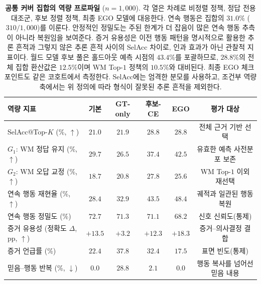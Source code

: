 \documentclass[letterpaper]{article}
\newcommand{\obs}[1]{\textcolor{measuredblue}{#1}}
\newcommand{\method}{\textsc{EGO}}
\begin{document}
\begin{table}[t]
\centering
\small
\setlength{\tabcolsep}{5pt}
\begin{tabular}{p{}ccccc}
\toprule
역량 지표 & 기본 & GT-only & 후보-CE & \method{} & 평가 대상 \\
\midrule
SelAcc@Top-$K$ (\%, $\uparrow$)
  & \obs{$21.0$} & \obs{$21.9$} & \textbf{\obs{$28.8$}}
  & \textbf{\obs{$28.8$}} & 전체 근거 기반 선택 \\
$G_1$: WM 정답 유지 (\%, $\uparrow$)
  & \obs{$29.7$} & \obs{$26.5$} & \obs{$37.4$}
  & \textbf{\obs{$42.5$}} & 유효한 예측 사전분포 보존 \\
$G_2$: WM 오답 교정 (\%, $\uparrow$)
  & \obs{$18.7$} & \obs{$20.8$} & \textbf{\obs{$27.8$}}
  & \obs{$25.6$} & WM Top-\obs{$1$} 이외 재선택 \\
연속 행동 재현율 (\%, $\uparrow$)
  & \obs{$28.4$} & \obs{$32.9$} & \obs{$43.5$}
  & \textbf{\obs{$48.4$}} & 궤적과 일관된 행동 복원 \\
연속 행동 정밀도 (\%)
  & \obs{$72.7$} & \obs{$71.3$} & \obs{$71.1$}
  & \obs{$68.2$} & 신호 신뢰도(통제) \\
증거 유용성 (정확도 \(\Delta\), pp, $\uparrow$)
  & \obs{$+13.5$} & \obs{$+3.2$} & \obs{$+12.3$}
  & \textbf{\obs{$+18.3$}} & 증거--의사결정 결합 \\
증거 언급률 (\%)
  & \obs{$22.4$} & \obs{$37.8$} & \obs{$32.4$}
  & \obs{$17.5$} & 표면 빈도(통제) \\
믿음--행동 반복 (\%, $\downarrow$)
  & \obs{$0.0$} & \obs{$28.8$} & \obs{$2.1$}
  & \textbf{\obs{$0.0$}} & 행동 복사를 넘어선 믿음 내용 \\
\bottomrule
\end{tabular}
\caption{\textbf{공통 커버 집합의 역량 프로파일}
(\obs{$n{=}1{,}000$}). 각 열은 차례로 비정렬 정책, 정답 전용 대조군,
후보 정렬 정책, 최종 \method{} 모델에 대응한다.
연속 행동은 집합의 \obs{$31.0\%$}
(\obs{$310/1{,}000$})를 이룬다. 안정적인 정밀도는 주된 한계가 더 잡음이 많은
연속 행동 추측이 아니라 복원임을 보여준다. 증거 유용성은 이전 행동 패턴을
명시적으로 활용한 추론 흔적과 그렇지 않은 추론 흔적 사이의 SelAcc 차이로,
인과 효과가 아닌 관찰적 지표이다. 월드 모델 후보 풀은 홀드아웃 예측 시점의
\obs{$43.4\%$}를 포괄하므로, \obs{$28.8\%$}의 전체 집합 환산값은
\obs{$12.5\%$}이며 WM Top-\obs{$1$} 정책의 \obs{$10.5\%$}와 대비된다.
최종 \method{} 체크포인트도 같은 코호트에서
측정한다. SelAcc에는 엄격한 분모를 사용하고, 조건부 역량 축에서는 위 정의에
따라 형식이 잘못된 추론 흔적을 제외한다.}
\label{tab:capability}
\end{table}
\end{document}
